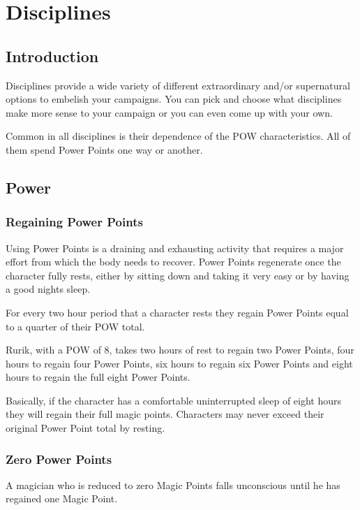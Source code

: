 \chapter{Disciplines}
\label{ch:disciplines}

\section{Introduction}
Disciplines provide a wide variety of different extraordinary and/or supernatural options to embelish your campaigns. You can pick and choose what disciplines make more sense to your campaign or you can even come up with your own.

Common in all disciplines is their dependence of the POW characteristics. All of them spend Power Points one way or another.

\section{Power}

\subsection{Regaining Power Points}
Using Power Points is a draining and exhausting activity that requires a major effort from which the body needs to recover. Power Points regenerate once the character fully rests, either by sitting down and taking it very easy or by having a good nights sleep. 

For every two hour period that a character rests they regain Power Points equal to a quarter of their POW total.  

\begin{rpg-examplebox}
Rurik, with a POW of 8, takes two hours of rest to regain two Power Points, four hours to regain four Power Points, six hours to regain six Power Points and eight hours to regain the full eight Power Points. 
\end{rpg-examplebox}

Basically, if the character has a comfortable uninterrupted sleep of eight hours they will regain their full magic points. Characters may never exceed their original Power Point total by resting.

\subsection{Zero Power Points}
A magician who is reduced to zero Magic Points falls unconscious until he has regained one Magic Point.

